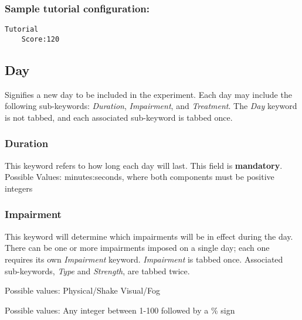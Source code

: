 \documentclass{article}
\begin{document}
\subsubsection*{Sample tutorial configuration:}
\begin{lstlisting}
Tutorial
    Score:120
\end{lstlisting}

\subsection*{Day}
Signifies a new day to be included in the experiment. Each day may include the following sub-keywords: \textit{Duration}, \textit{Impairment}, and \textit{Treatment}. The \textit{Day} keyword is not tabbed, and each associated sub-keyword is tabbed once.

\subsubsection*{Duration}
This keyword refers to how long each day will last. This field is \textbf{mandatory}. \newline
\indent Possible Values: \newline
\indent\indent minutes:seconds, where both components must be positive integers \newline

\subsubsection*{Impairment}
This keyword will determine which impairments will be in effect during the day. There can be one or more impairments imposed on a single day; each one requires its own \textit{Impairment} keyword. \textit{Impairment} is tabbed once. Associated sub-keywords, \textit{Type} and \textit{Strength}, are tabbed twice. \newline

 \newline
\indent Possible values: \newline
\indent\indent Physical/Shake \newline
\indent\indent Visual/Fog \newline


 \newline
\indent Possible values: \newline
\indent\indent Any integer between 1-100 followed by a \% sign \newline
    
\end{document}

